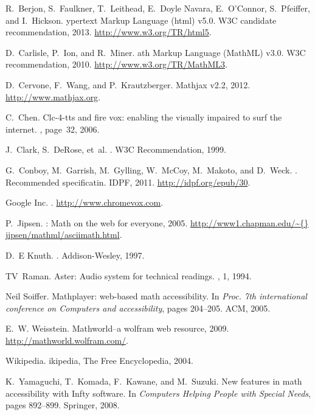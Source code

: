 \documentclass{sig-alternate}
\begin{document}
\begin{thebibliography}{10}

R.~Berjon, S.~Faulkner, T.~Leithead, E.~Doyle Navara, E.~O'Connor, S.~Pfeiffer, and I.~Hickson.
ypertext {M}arkup {L}anguage (html) v5.0.
\newblock W3C candidate recommendation, 2013.
\newblock \url{http://www.w3.org/TR/html5}.

D.~Carlisle, P.~Ion, and R.~Miner.
ath {M}arkup {L}anguage ({MathML}) v3.0. 
\newblock W3C recommendation, 2010. 
\newblock \url{http://www.w3.org/TR/MathML3}.

D.~Cervone, F.~Wang, and P.~Krautzberger.
\newblock Mathjax v2.2, 2012.
\newblock \url{http://www.mathjax.org}.

C.~Chen.
\newblock Clc-4-tts and fire vox: enabling the visually impaired to surf the
  internet.
, page~32, 2006.

J.~Clark, S.~DeRose, et~al.
.
\newblock W3C Recommendation,  1999.

G.~Conboy, M.~Garrish, M.~Gylling, W.~McCoy, M.~Makoto, and
  D.~Weck.
.
\newblock Recommended specificatin. IDPF, 2011.
\newblock \url{http://idpf.org/epub/30}.

{Google} Inc.
.
\newblock \url{http://www.chromevox.com}.

P.~Jipsen.
: Math on the web for everyone, 2005.
\newblock \url{http://www1.chapman.edu/\~{}
  jipsen/mathml/asciimath.html}.

D.~E Knuth.
.
\newblock Addison-Wesley, 1997.

TV~Raman.
\newblock Aster: Audio system for technical readings.
, 1, 1994.

Neil Soiffer.
\newblock Mathplayer: web-based math accessibility.
\newblock In {\em Proc. 7th international conference
  on Computers and accessibility}, pages 204--205. ACM, 2005.

E.~W. Weisstein.
\newblock Mathworld--a wolfram web resource, 2009.
\newblock \url{http://mathworld.wolfram.com/}.

Wikipedia.
ikipedia{,} {The Free Encyclopedia}, 2004.

K.~Yamaguchi, T.~Komada, F.~Kawane, and M.~Suzuki.
\newblock New features in math accessibility with Infty software.
\newblock In {\em Computers Helping People with Special Needs}, pages 892--899.
  Springer, 2008.

\end{thebibliography}
\end{document}
